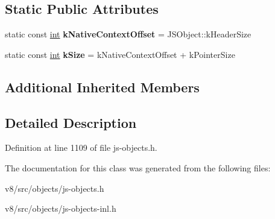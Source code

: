 \subsection*{Static Public Attributes}
\begin{DoxyCompactItemize}
\item 
\mbox{\label{classv8_1_1internal_1_1JSGlobalProxy_a8636791b0b48721886318cbda1674872}} 
static const \mbox{\hyperlink{classint}{int}} {\bfseries k\+Native\+Context\+Offset} = J\+S\+Object\+::k\+Header\+Size
\item 
\mbox{\label{classv8_1_1internal_1_1JSGlobalProxy_a27f9783972c70443622c9869d720f5f5}} 
static const \mbox{\hyperlink{classint}{int}} {\bfseries k\+Size} = k\+Native\+Context\+Offset + k\+Pointer\+Size
\end{DoxyCompactItemize}
\subsection*{Additional Inherited Members}


\subsection{Detailed Description}


Definition at line 1109 of file js-\/objects.\+h.



The documentation for this class was generated from the following files\+:\begin{DoxyCompactItemize}
\item 
v8/src/objects/js-\/objects.\+h\item 
v8/src/objects/js-\/objects-\/inl.\+h\end{DoxyCompactItemize}
